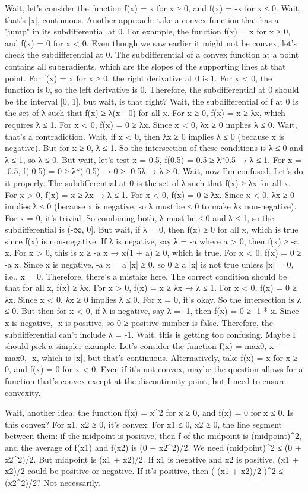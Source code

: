 Wait, let's consider the function f(x) = x for x ≥ 0, and f(x) = -x for x ≤ 0. Wait, that's |x|, continuous. Another approach: take a convex function that has a "jump" in its subdifferential at 0. For example, the function f(x) = x for x ≥ 0, and f(x) = 0 for x < 0. Even though we saw earlier it might not be convex, let's check the subdifferential at 0. The subdifferential of a convex function at a point contains all subgradients, which are the slopes of the supporting lines at that point. For f(x) = x for x ≥ 0, the right derivative at 0 is 1. For x < 0, the function is 0, so the left derivative is 0. Therefore, the subdifferential at 0 should be the interval [0, 1], but wait, is that right? Wait, the subdifferential of f at 0 is the set of λ such that f(x) ≥ λ(x - 0) for all x. For x ≥ 0, f(x) = x ≥ λx, which requires λ ≤ 1. For x < 0, f(x) = 0 ≥ λx. Since x < 0, λx ≥ 0 implies λ ≤ 0. Wait, that's a contradiction. Wait, if x < 0, then λx ≥ 0 implies λ ≤ 0 (because x is negative). But for x ≥ 0, λ ≤ 1. So the intersection of these conditions is λ ≤ 0 and λ ≤ 1, so λ ≤ 0. But wait, let's test x = 0.5, f(0.5) = 0.5 ≥ λ*0.5 → λ ≤ 1. For x = -0.5, f(-0.5) = 0 ≥ λ*(-0.5) → 0 ≥ -0.5λ → λ ≥ 0. Wait, now I'm confused. Let's do it properly. The subdifferential at 0 is the set of λ such that f(x) ≥ λx for all x. For x > 0, f(x) = x ≥ λx → λ ≤ 1. For x < 0, f(x) = 0 ≥ λx. Since x < 0, λx ≥ 0 implies λ ≤ 0 (because x is negative, so λ must be ≤ 0 to make λx non-negative). For x = 0, it's trivial. So combining both, λ must be ≤ 0 and λ ≤ 1, so the subdifferential is (-∞, 0]. But wait, if λ = 0, then f(x) ≥ 0 for all x, which is true since f(x) is non-negative. If λ is negative, say λ = -a where a > 0, then f(x) ≥ -a x. For x > 0, this is x ≥ -a x → x(1 + a) ≥ 0, which is true. For x < 0, f(x) = 0 ≥ -a x. Since x is negative, -a x = a |x| ≥ 0, so 0 ≥ a |x| is not true unless |x| = 0, i.e., x = 0. Therefore, there's a mistake here. The correct condition should be that for all x, f(x) ≥ λx. For x > 0, f(x) = x ≥ λx → λ ≤ 1. For x < 0, f(x) = 0 ≥ λx. Since x < 0, λx ≥ 0 implies λ ≤ 0. For x = 0, it's okay. So the intersection is λ ≤ 0. But then for x < 0, if λ is negative, say λ = -1, then f(x) = 0 ≥ -1 * x. Since x is negative, -x is positive, so 0 ≥ positive number is false. Therefore, the subdifferential can't include λ = -1. Wait, this is getting too confusing. Maybe I should pick a simpler example. Let's consider the function f(x) = max{0, x} + max{0, -x}, which is |x|, but that's continuous. Alternatively, take f(x) = x for x ≥ 0, and f(x) = 0 for x < 0. Even if it's not convex, maybe the question allows for a function that's convex except at the discontinuity point, but I need to ensure convexity.

Wait, another idea: the function f(x) = x^2 for x ≥ 0, and f(x) = 0 for x ≤ 0. Is this convex? For x1, x2 ≥ 0, it's convex. For x1 ≤ 0, x2 ≥ 0, the line segment between them: if the midpoint is positive, then f of the midpoint is (midpoint)^2, and the average of f(x1) and f(x2) is (0 + x2^2)/2. We need (midpoint)^2 ≤ (0 + x2^2)/2. But midpoint is (x1 + x2)/2. If x1 is negative and x2 is positive, (x1 + x2)/2 could be positive or negative. If it's positive, then ( (x1 + x2)/2 )^2 ≤ (x2^2)/2? Not necessarily.